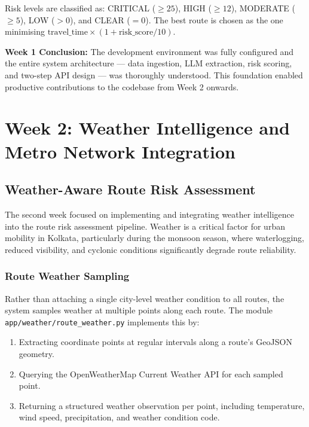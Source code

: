 \documentclass[12pt, a4paper]{report}
\begin{document}
Risk levels are classified as: CRITICAL ($\geq 25$), HIGH ($\geq 12$), MODERATE ($\geq 5$), LOW ($> 0$), and CLEAR ($= 0$). The best route is chosen as the one minimising $\text{travel\_time} \times (1 + \text{risk\_score}/10)$.

\textbf{Week 1 Conclusion:} The development environment was fully configured and the entire system architecture — data ingestion, LLM extraction, risk scoring, and two-step API design — was thoroughly understood. This foundation enabled productive contributions to the codebase from Week 2 onwards.

\clearpage

\chapter{Week 2: Weather Intelligence and Metro Network Integration}
\label{chap:week2}

\section{Weather-Aware Route Risk Assessment}

The second week focused on implementing and integrating weather intelligence into the route risk assessment pipeline. Weather is a critical factor for urban mobility in Kolkata, particularly during the monsoon season, where waterlogging, reduced visibility, and cyclonic conditions significantly degrade route reliability.

\subsection{Route Weather Sampling}

Rather than attaching a single city-level weather condition to all routes, the system samples weather at multiple points along each route. The module \texttt{app/weather/route\_weather.py} implements this by:

\begin{enumerate}
    \item Extracting coordinate points at regular intervals along a route's GeoJSON geometry.
    \item Querying the OpenWeatherMap Current Weather API for each sampled point.
    \item Returning a structured weather observation per point, including temperature, wind speed, precipitation, and weather condition code.
\end{enumerate}
\end{document}
